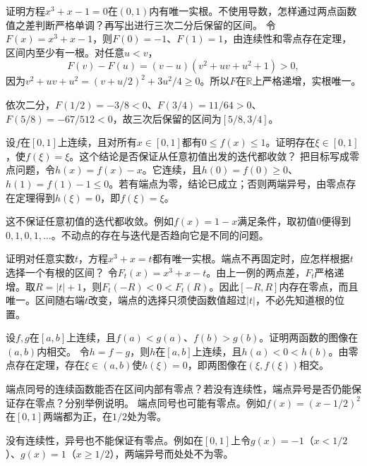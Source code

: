 证明方程\(x^3+x-1=0\)在\((0,1)\)内有唯一实根。不使用导数，怎样通过两点函数值之差判断严格单调？再写出进行三次二分后保留的区间。
\solutionanswer
令\(F(x)=x^3+x-1\)，则\(F(0)=-1\)、\(F(1)=1\)，由连续性和零点存在定理，区间内至少有一根。对任意\(u<v\)，
\[
F(v)-F(u)=(v-u)(v^2+uv+u^2+1)>0,
\]
因为\(v^2+uv+u^2=(v+u/2)^2+3u^2/4\ge0\)。所以\(F\)在\(\mathbb R\)上严格递增，实根唯一。

依次二分，\(F(1/2)=-3/8<0\)、\(F(3/4)=11/64>0\)、\(F(5/8)=-67/512<0\)，故三次后保留的区间为\([5/8,3/4]\)。


设\(f\)在\([0,1]\)上连续，且对所有\(x\in[0,1]\)都有\(0\le f(x)\le1\)。证明存在\(\xi\in[0,1]\)，使\(f(\xi)=\xi\)。这个结论是否保证从任意初值出发的迭代都收敛？
\solutionanswer
把目标写成零点问题，令\(h(x)=f(x)-x\)。它连续，且\(h(0)=f(0)\ge0\)、\(h(1)=f(1)-1\le0\)。若有端点为零，结论已成立；否则两端异号，由零点存在定理得到\(h(\xi)=0\)，即\(f(\xi)=\xi\)。

这不保证任意初值的迭代都收敛。例如\(f(x)=1-x\)满足条件，取初值\(0\)便得到\(0,1,0,1,\ldots\)。不动点的存在与迭代是否趋向它是不同的问题。


证明对任意实数\(t\)，方程\(x^3+x=t\)都有唯一实根。端点不再固定时，应怎样根据\(t\)选择一个有根的区间？
\solutionanswer
令\(F_t(x)=x^3+x-t\)。由上一例的两点差，\(F_t\)严格递增。取\(R=|t|+1\)，则\(F_t(-R)<0<F_t(R)\)。因此\([-R,R]\)内存在零点，而且唯一。区间随右端\(t\)改变，端点的选择只须使函数值超过\(|t|\)，不必先知道根的位置。


设\(f,g\)在\([a,b]\)上连续，且\(f(a)<g(a)\)、\(f(b)>g(b)\)。证明两函数的图像在\((a,b)\)内相交。
\solutionanswer
令\(h=f-g\)，则\(h\)在\([a,b]\)上连续，且\(h(a)<0<h(b)\)。由零点存在定理，存在\(\xi\in(a,b)\)使\(h(\xi)=0\)，即两图像在\((\xi,f(\xi))\)相交。


端点同号的连续函数能否在区间内部有零点？若没有连续性，端点异号是否仍能保证存在零点？分别举例说明。
\solutionanswer
端点同号也可能有零点。例如\(f(x)=(x-1/2)^2\)在\([0,1]\)两端都为正，在\(1/2\)处为零。

没有连续性，异号也不能保证有零点。例如在\([0,1]\)上令\(g(x)=-1\)（\(x<1/2\)）、\(g(x)=1\)（\(x\ge1/2\)），两端异号而处处不为零。


